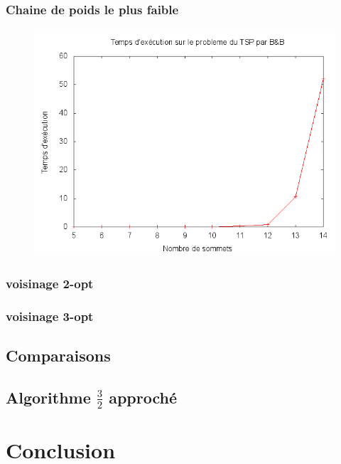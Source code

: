 \subsubsection{Chaine de poids le plus faible}
\begin{figure}[H]
	\includegraphics[width=\linewidth]{../pratique/branch_and_bound_dev/tsp_bb.png}
\end{figure}

\subsubsection{voisinage 2-opt}

\subsubsection{voisinage 3-opt}


\subsection{Comparaisons}


\subsection{Algorithme $\frac{3}{2}$ approché}



\section{Conclusion}


